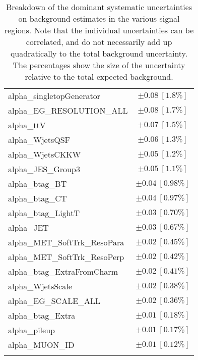 \begin{table}
\begin{center}
\begin{tabular*}{\textwidth}{@{\extracolsep{\fill}}lc}
alpha\_singletopGenerator         & $\pm 0.08\ [1.8\%] $       \\
alpha\_EG\_RESOLUTION\_ALL         & $\pm 0.08\ [1.7\%] $       \\
alpha\_ttV         & $\pm 0.07\ [1.5\%] $       \\
alpha\_WjetsQSF         & $\pm 0.06\ [1.3\%] $       \\
alpha\_WjetsCKKW         & $\pm 0.05\ [1.2\%] $       \\
alpha\_JES\_Group3         & $\pm 0.05\ [1.1\%] $       \\
alpha\_btag\_BT         & $\pm 0.04\ [0.98\%] $       \\
alpha\_btag\_CT         & $\pm 0.04\ [0.97\%] $       \\
alpha\_btag\_LightT         & $\pm 0.03\ [0.70\%] $       \\
alpha\_JET         & $\pm 0.03\ [0.67\%] $       \\
alpha\_MET\_SoftTrk\_ResoPara         & $\pm 0.02\ [0.45\%] $       \\
alpha\_MET\_SoftTrk\_ResoPerp         & $\pm 0.02\ [0.42\%] $       \\
alpha\_btag\_ExtraFromCharm         & $\pm 0.02\ [0.41\%] $       \\
alpha\_WjetsScale         & $\pm 0.02\ [0.38\%] $       \\
alpha\_EG\_SCALE\_ALL         & $\pm 0.02\ [0.36\%] $       \\
alpha\_btag\_Extra         & $\pm 0.01\ [0.18\%] $       \\
alpha\_pileup         & $\pm 0.01\ [0.17\%] $       \\
alpha\_MUON\_ID         & $\pm 0.01\ [0.12\%] $       \\
\noalign{\smallskip}\hline\noalign{\smallskip}
\end{tabular*}
\end{center}
\caption[Breakdown of uncertainty on background estimates]{
Breakdown of the dominant systematic uncertainties on background estimates in the various signal regions.
Note that the individual uncertainties can be correlated, and do not necessarily add up quadratically to 
the total background uncertainty. The percentages show the size of the uncertainty relative to the total expected background.
\label{table.results.bkgestimate.uncertainties.SRHMEM_cuts}}
\end{table}
%